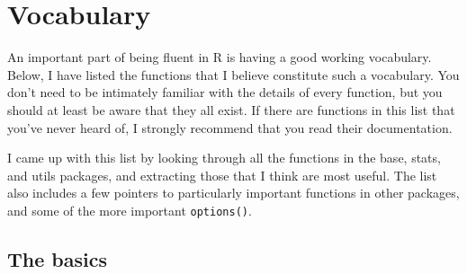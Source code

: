 \chapter{Vocabulary}\label{vocabulary}

An important part of being fluent in R is having a good working
vocabulary. Below, I have listed the functions that I believe constitute
such a vocabulary. You don't need to be intimately familiar with the
details of every function, but you should at least be aware that they
all exist. If there are functions in this list that you've never heard
of, I strongly recommend that you read their documentation.

I came up with this list by looking through all the functions in the
base, stats, and utils packages, and extracting those that I think are
most useful. The list also includes a few pointers to particularly
important functions in other packages, and some of the more important
\texttt{options()}.

\section{The basics}

